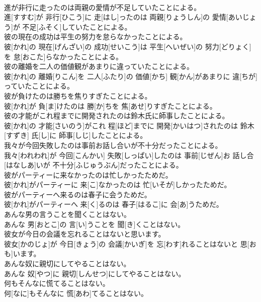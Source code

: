 \documentclass[8pt]{extreport}
\begin{document}
\begin{CJK}{UTF8}{min}
\\	進が非行に走ったのは両親の愛情が不足していたことによる。	
\\	進[すすむ]が 非行[ひこう]に 走[はし]ったのは 両親[りょうしん]の 愛情[あいじょう]が 不足[ふそく]していたことによる。
\\	彼の現在の成功は平生の努力を怠らなかったことによる。	
\\	彼[かれ]の 現在[げんざい]の 成功[せいこう]は 平生[へいぜい]の 努力[どりょく]を 怠[おこた]らなかったことによる。
\\	彼の離婚を二人の価値観があまりに違っていたことによる。	
\\	彼[かれ]の 離婚[りこん]を 二人[ふたり]の 価値[かち] 観[かん]があまりに 違[ちが]っていたことによる。
\\	彼が負けたのは勝ちを焦りすぎたことによる。	
\\	彼[かれ]が 負[ま]けたのは 勝[か]ちを 焦[あせ]りすぎたことによる。
\\	彼の才能がこれ程までに開発されたのは鈴木氏に師事したことによる。	
\\	彼[かれ]の 才能[さいのう]がこれ 程[ほど]までに 開発[かいはつ]されたのは 鈴木[すずき] 氏[し]に 師事[しじ]したことによる。
\\	我々が今回失敗したのは事前お話し合いが不十分だったことによる。	
\\	我々[われわれ]が 今回[こんかい] 失敗[しっぱい]したのは 事前[じぜん]お 話し合[はなしあ]いが 不十分[ふじゅうぶん]だったことによる。
\\	彼がパーティーに来なかったのは忙しかったためだ。	
\\	彼[かれ]がパーティーに 来[こ]なかったのは 忙[いそが]しかったためだ。
\\	彼がパーティーへ来るのは春子に会うためだ。	
\\	彼[かれ]がパーティーへ 来[く]るのは 春子[はるこ]に 会[あ]うためだ。
\\	あんな男の言うことを聞くことはない。	
\\	あんな 男[おとこ]の 言[い]うことを 聞[き]くことはない。
\\	彼女が今日の会議を忘れることはないと思います。	
\\	彼女[かのじょ]が 今日[きょう]の 会議[かいぎ]を 忘[わす]れることはないと 思[おも]います。
\\	あんな奴に親切にしてやることはない。	
\\	あんな 奴[やつ]に 親切[しんせつ]にしてやることはない。
\\	何もそんなに慌てることはない。	
\\	何[なに]もそんなに 慌[あわ]てることはない。

\end{CJK}
\end{document}
